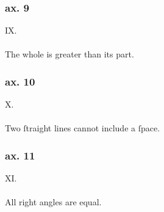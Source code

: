\begin{minipage}{0.165\textwidth}
    \phantom{}
\end{minipage}%
\begin{minipage}{0.67\textwidth}
    \subsubsection{ax. 9}
    \begin{center}
        IX.\label{ax9}\\
        \hfill\\
        The whole is greater than its part.\\
    \end{center}
    \subsubsection{ax. 10}
    \begin{center}
        X.\label{ax10}\\
        \hfill\\
        Two ſtraight lines cannot include a ſpace.\\
    \end{center}
    \subsubsection{ax. 11}
    \begin{center}
        XI.\label{ax11}\\
        \hfill\\
        All right angles are equal.\\
    \end{center}
\end{minipage}%
\begin{minipage}{0.165\textwidth}
    \phantom{}
\end{minipage}

\pagebreak

